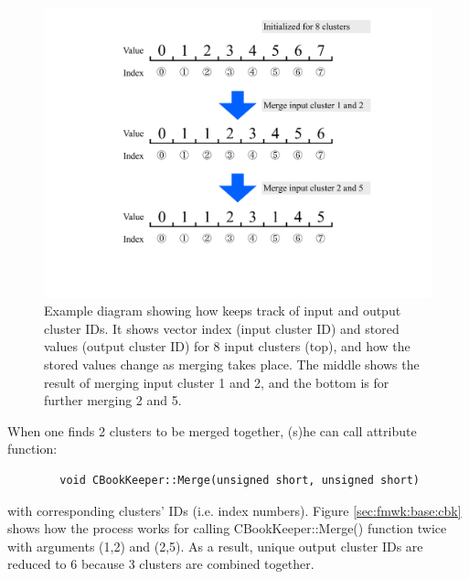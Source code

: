 \begin{figure}\begin{center}
\includegraphics[width=14cm]{./src/Pictures/CBookKeeperExample.pdf}
\caption{Example diagram showing how {\cbkeeper} keeps track of input and output cluster IDs. It shows {\cbkeeper} vector index (input cluster ID) and stored values (output cluster ID) for 8 input clusters (top), and how the stored values change as merging takes place. The middle shows the result of merging input cluster 1 and 2, and the bottom is for further merging 2 and 5.}
\end{center}\end{figure}
When one finds 2 clusters to be merged together, (s)he can call {\cbkeeper} attribute function:
\begin{lstlisting}
        void CBookKeeper::Merge(unsigned short, unsigned short)
\end{lstlisting}
with corresponding clusters' IDs (i.e. index numbers). 
Figure \ref{sec:fmwk:base:cbk} shows how the process works for calling {\ttfamily CBookKeeper::Merge()} function twice with arguments (1,2) and (2,5).
As a result, unique output cluster IDs are reduced to 6 because 3 clusters are combined together.

